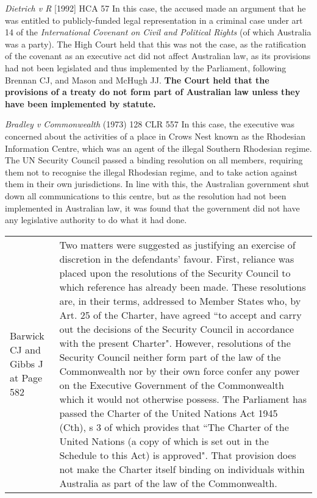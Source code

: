 \begin{casedetails}{\textit{Dietrich v R} [1992] HCA 57}\label{case: Dietrich v R}
    \flushleft
    In this case, the accused made an argument that he was entitled to publicly-funded legal representation in a criminal case under art 14 of the \textit{International Covenant on Civil and Political Rights} (of which Australia was a party). The High Court held that this was not the case, as the ratification of the covenant as an executive act did not affect Australian law, as its provisions had not been legislated and thus implemented by the Parliament, following Brennan CJ, and Mason and McHugh JJ. \textbf{The Court held that the provisions of a treaty do not form part of Australian law unless they have been implemented by statute.}
\end{casedetails}

\begin{casedetails}{\textit{Bradley v Commonwealth} (1973) 128 CLR 557}\label{case:Bradley v Commonwealth}
    \flushleft
    In this case, the executive was concerned about the activities of a place in Crows Nest known as the Rhodesian Information Centre, which was an agent of the illegal Southern Rhodesian regime. The UN Security Council passed a binding resolution on all members, requiring them not to recognise the illegal Rhodesian regime, and to take action against them in their own jurisdictions. In line with this, the Australian government shut down all communications to this centre, but as the resolution had not been implemented in Australian law, it was found that the government did not have any legislative authority to do what it had done.

    \begin{longtable}{p{}|>{\raggedright\arraybackslash}p{}}
        Barwick CJ and Gibbs J at Page 582 & Two matters were suggested as justifying an exercise of discretion in the defendants' favour. First, reliance was placed upon the resolutions of the Security Council to which reference has already been made. These resolutions are, in their terms, addressed to Member States who, by Art. 25 of the Charter, have agreed ``to accept and carry out the decisions of the Security Council in accordance with the present Charter". However, resolutions of the Security Council neither form part of the law of the Commonwealth nor by their own force confer any power on the Executive Government of the Commonwealth which it would not otherwise possess. The Parliament has passed the Charter of the United Nations Act 1945 (Cth), s 3 of which provides that ``The Charter of the United Nations (a copy of which is set out in the Schedule to this Act) is approved". That provision does not make the Charter itself binding on individuals within Australia as part of the law of the Commonwealth.
    \end{longtable} 
    
\end{casedetails}

